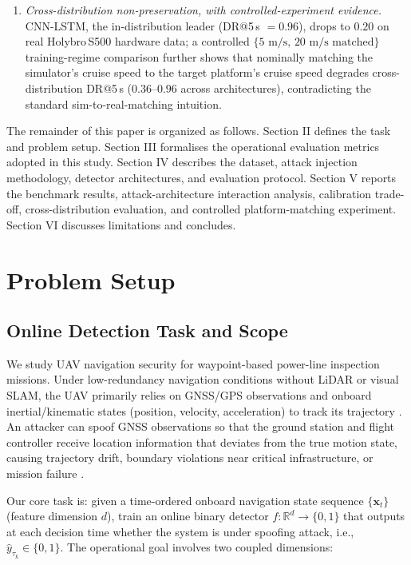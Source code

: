 \documentclass{ieeeaccess}
\begin{document}
\begin{itemize}
\begin{enumerate}
      invisible to attack-averaged metrics.
    \item \emph{Cross-distribution non-preservation, with controlled-experiment
      evidence.} CNN-LSTM, the in-distribution leader (DR@5\,s $=0.96$), drops
      to $0.20$ on real Holybro\,S500 hardware data; a controlled
      $\{5\text{ m/s},\,20\text{ m/s matched}\}$ training-regime comparison
      further shows that nominally matching the simulator's cruise speed to
      the target platform's cruise speed degrades cross-distribution DR@5\,s
      ($0.36$--$0.96$ across architectures), contradicting the standard
      sim-to-real-matching intuition.
  \end{enumerate}
\end{itemize}

The remainder of this paper is organized as follows. Section II defines the task and problem setup. Section III formalises the operational evaluation metrics adopted in this study. Section IV describes the dataset, attack injection methodology, detector architectures, and evaluation protocol. Section V reports the benchmark results, attack-architecture interaction analysis, calibration trade-off, cross-distribution evaluation, and controlled platform-matching experiment. Section VI discusses limitations and concludes.

\section{Problem Setup}

\subsection{Online Detection Task and Scope}

We study UAV navigation security for waypoint-based power-line inspection missions. Under low-redundancy navigation conditions without LiDAR or visual SLAM, the UAV primarily relies on GNSS/GPS observations and onboard inertial/kinematic states (position, velocity, acceleration) to track its trajectory \cite{ref19}. An attacker can spoof GNSS observations so that the ground station and flight controller receive location information that deviates from the true motion state, causing trajectory drift, boundary violations near critical infrastructure, or mission failure \cite{ref20}.

Our core task is: given a time-ordered onboard navigation state sequence \(\{\mathbf{x}_t\}\) (feature dimension \(d\)), train an online binary detector \(f: \mathbb{R}^d \to \{0,1\}\) that outputs at each decision time whether the system is under spoofing attack, i.e., \(\hat{y}_{\tau_k} \in \{0,1\}\). The operational goal involves two coupled dimensions:
\end{document}
